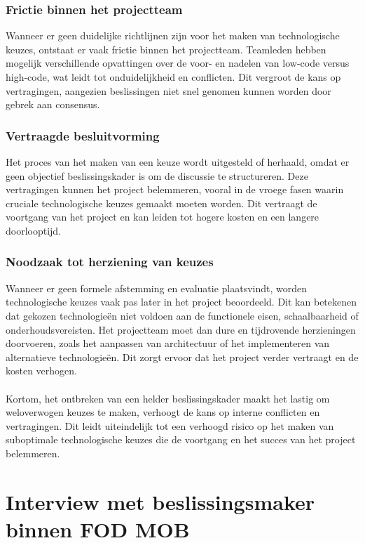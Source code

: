\subsubsection{Frictie binnen het projectteam}
Wanneer er geen duidelijke richtlijnen zijn voor het maken van technologische keuzes, ontstaat er vaak frictie binnen het projectteam. Teamleden hebben mogelijk verschillende opvattingen over de voor- en nadelen van low-code versus high-code, wat leidt tot onduidelijkheid en conflicten. Dit vergroot de kans op vertragingen, aangezien beslissingen niet snel genomen kunnen worden door gebrek aan consensus.
\subsubsection{Vertraagde besluitvorming}
Het proces van het maken van een keuze wordt uitgesteld of herhaald, omdat er geen objectief beslissingskader is om de discussie te structureren. Deze vertragingen kunnen het project belemmeren, vooral in de vroege fasen waarin cruciale technologische keuzes gemaakt moeten worden. Dit vertraagt de voortgang van het project en kan leiden tot hogere kosten en een langere doorlooptijd.
\subsubsection{Noodzaak tot herziening van keuzes}
Wanneer er geen formele afstemming en evaluatie plaatsvindt, worden technologische keuzes vaak pas later in het project beoordeeld. Dit kan betekenen dat gekozen technologieën niet voldoen aan de functionele eisen, schaalbaarheid of onderhoudsvereisten. Het projectteam moet dan dure en tijdrovende herzieningen doorvoeren, zoals het aanpassen van architectuur of het implementeren van alternatieve technologieën. Dit zorgt ervoor dat het project verder vertraagt en de kosten verhogen.
\\
\\
Kortom, het ontbreken van een helder beslissingskader maakt het lastig om weloverwogen keuzes te maken, verhoogt de kans op interne conflicten en vertragingen. Dit leidt uiteindelijk tot een verhoogd risico op het maken van suboptimale technologische keuzes die de voortgang en het succes van het project belemmeren.

\section{Interview met beslissingsmaker binnen \gls{FOD MOB}}

